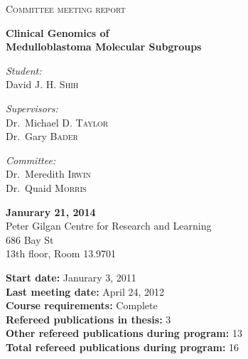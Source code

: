 \begin{titlepage}

\setlength{\topmargin}{30mm}

\begin{center}
 
\textsc{\Large Committee meeting report}\bigskip

{\huge \bfseries Clinical Genomics of \\[5mm]Medulloblastoma Molecular Subgroups}\\[10mm]

\begin{minipage}{0.6\textwidth}
\begin{multicols}{2}
	\begin{flushleft}
		\large \emph{Student:}\\
		David J. H. \textsc{Shih}
	\end{flushleft}
	\vfill
	\columnbreak
	\begin{flushright}
		\large \emph{Supervisors:}\\
		Dr.~Michael D. \textsc{Taylor}\\
		Dr.~Gary \textsc{Bader}\\
	\end{flushright}
	\begin{flushright}
		\large \emph{Committee:}\\
		Dr.~Meredith \textsc{Irwin}\\
		Dr.~Quaid \textsc{Morris}
	\end{flushright}
\end{multicols}
\end{minipage}

\vspace{20mm}

{ \large 
\textbf{Janurary 21, 2014}\\
\medskip
Peter Gilgan Centre for Research and Learning\\
686 Bay St\\
13th floor, Room 13.9701
}

\vspace{40mm}

\begin{flushleft}
	{ \large
	\textbf{Start date:} Janurary 3, 2011\\
	\textbf{Last meeting date:} April 24, 2012\\
	\medskip
	\textbf{Course requirements:} Complete\\
	\medskip
	\textbf{Refereed publications in thesis:} 3\\
	\textbf{Other refereed publications during program:} 13\\
	\textbf{Total refereed publications during program:} 16\\
	}
\end{flushleft}


\end{center}

\end{titlepage}
